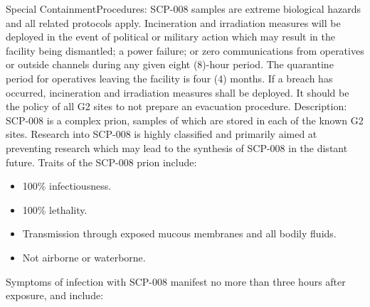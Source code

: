 \documentclass[a4paper, 11pt]{article}
\begin{document}
Special Containment\linebreak Procedures: SCP-008 samples are extreme biological hazards and all related protocols apply. Incineration and irradiation measures will be deployed in the event of political or military action which may result in the facility being dismantled; a power failure; or zero communications from operatives or outside channels during any given eight (8)-hour period. The quarantine period for operatives leaving the facility is four (4) months. If a breach has occurred, incineration and irradiation measures shall be deployed. It should be the policy of all G2 sites to not prepare an evacuation procedure.
Description: SCP-008 is a complex prion, samples of which are stored in each of the known G2 sites. Research into SCP-008 is highly classified and primarily aimed at preventing research which may lead to the synthesis of SCP-008 in the distant future. Traits of the SCP-008 prion include:
\begin{itemize}
\item 100\% infectiousness.
\item 100\% lethality.
\item Transmission through exposed mucous membranes and all bodily fluids.
\item Not airborne or waterborne.
\end{itemize}
Symptoms of infection with SCP-008 manifest no more than three hours after exposure, and include:
\end{document}
